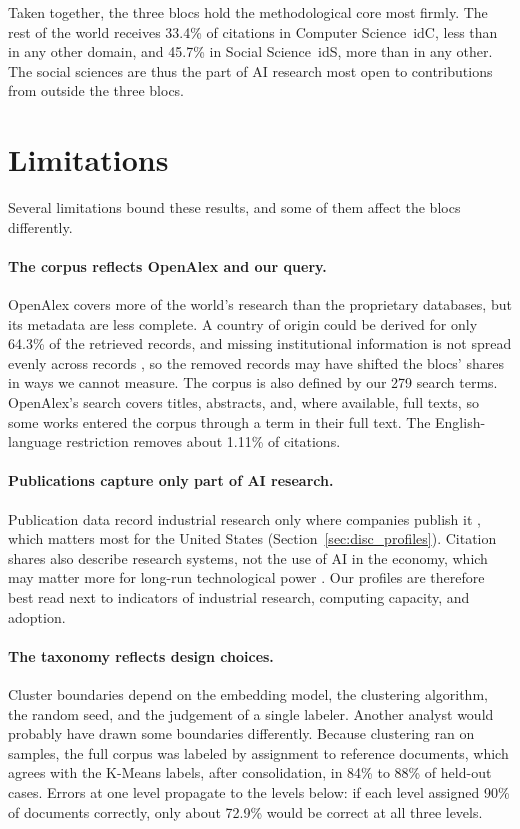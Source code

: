 \documentclass[10pt,twocolumn,a4paper]{article}
\newcommand{\cl}[3]{\textsf{#1}~\csname id#2\endcsname{#3}}
\begin{document}
	Taken together, the three blocs hold the methodological core most firmly. The rest of the world receives 33.4\% of citations in \cl{Computer Science}{C}{0}, less than in any other domain, and 45.7\% in \cl{Social Science}{S}{2}, more than in any other. The social sciences are thus the part of AI research most open to contributions from outside the three blocs.
	
	
	\section{Limitations}
	\label{sec:limitations}
	
	Several limitations bound these results, and some of them affect the blocs differently.
	
	\paragraph{The corpus reflects OpenAlex and our query.} OpenAlex covers more of the world's research than the proprietary databases, but its metadata are less complete. A country of origin could be derived for only 64.3\% of the retrieved records, and missing institutional information is not spread evenly across records \parencite{zhang2024missing}, so the removed records may have shifted the blocs' shares in ways we cannot measure. The corpus is also defined by our 279 search terms. OpenAlex's search covers titles, abstracts, and, where available, full texts, so some works entered the corpus through a term in their full text. The English-language restriction removes about 1.11\% of citations.
	
	\paragraph{Publications capture only part of AI research.} Publication data record industrial research only where companies publish it \parencite{ahmed2023growing}, which matters most for the United States (Section~\ref{sec:disc_profiles}). Citation shares also describe research systems, not the use of AI in the economy, which may matter more for long-run technological power \parencite{ding2024diffusion}. Our profiles are therefore best read next to indicators of industrial research, computing capacity, and adoption.
	
	\paragraph{The taxonomy reflects design choices.} Cluster boundaries depend on the embedding model, the clustering algorithm, the random seed, and the judgement of a single labeler. Another analyst would probably have drawn some boundaries differently. Because clustering ran on samples, the full corpus was labeled by assignment to reference documents, which agrees with the K-Means labels, after consolidation, in 84\% to 88\% of held-out cases. Errors at one level propagate to the levels below: if each level assigned 90\% of documents correctly, only about 72.9\% would be correct at all three levels.
	
\end{document}
